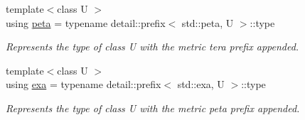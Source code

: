 \begin{DoxyCompactItemize}
{\footnotesize template$<$class U $>$ }\\using \hyperlink{group___unit_manipulators_ga1a39274621859b9e6cf6e7019cd14e47}{peta} = typename detail\+::prefix$<$ std\+::peta, U $>$\+::type
\begin{DoxyCompactList}\small\item\em Represents the type of {\ttfamily class U} with the metric \textquotesingle{}tera\textquotesingle{} prefix appended. \end{DoxyCompactList}\item 
{\footnotesize template$<$class U $>$ }\\using \hyperlink{group___unit_manipulators_gad0c18c5a47e0fe677715f0328f818515}{exa} = typename detail\+::prefix$<$ std\+::exa, U $>$\+::type
\begin{DoxyCompactList}\small\item\em Represents the type of {\ttfamily class U} with the metric \textquotesingle{}peta\textquotesingle{} prefix appended. \end{DoxyCompactList}\end{DoxyCompactItemize}

